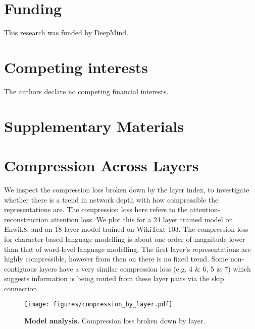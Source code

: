 \documentclass{article} \usepackage{iclr2020_conference,times}
\begin{document}
\section*{Funding}
This research was funded by DeepMind.

\section*{Competing interests}
The authors declare no competing financial interests.
\else
\fi

\newpage 


\setlength{\bibsep}{5pt} 
\setlength{\bibhang}{0pt}




\newpage 
\appendix
\section*{Supplementary Materials}

\section{Compression Across Layers}
\label{app:compression_loss_layer}
We inspect the compression loss broken down by the layer index, to investigate whether there is a trend in network depth with how compressible the representations are. The compression loss here refers to the attention-reconstruction attention loss. We plot this for a 24 layer trained model on Enwik8, and an 18 layer model trained on WikiText-103. The compression loss for character-based language modelling is about one order of magnitude lower than that of word-level language modelling. The first layer's representations are highly compressible, however from then on there is no fixed trend. Some non-contiguous layers have a very similar compression loss (e.g. 4 \& 6, 5 \& 7) which suggests information is being routed from these layer pairs via the skip connection.

\begin{figure}[h!]
    \centering
    \texttt{[image: figures/compression\_by\_layer.pdf]}
    \caption{\textbf{Model analysis.} Compression loss broken down by layer.}
    \label{fig:compression_loss_layer}
\end{figure}
\end{document}
